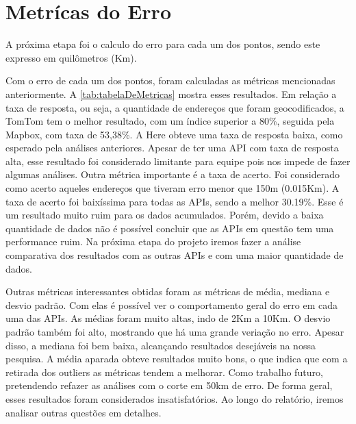 \section{Metrícas do Erro}
A próxima etapa foi o calculo do erro para cada um dos pontos, sendo este expresso em quilômetros (Km).

Com o erro de cada um dos pontos, foram calculadas as métricas mencionadas anteriormente. A \ref{tab:tabelaDeMetricas} mostra esses resultados. 
Em relação a taxa de resposta, ou seja, a quantidade de endereços que foram geocodificados, a TomTom tem o melhor resultado, com um índice superior a 80\%, seguida pela Mapbox, com taxa de 53,38\%. A Here obteve uma taxa de resposta baixa, como esperado pela análises anteriores. Apesar de ter uma API com taxa de resposta alta, esse resultado foi considerado limitante para equipe pois nos impede de fazer algumas análises.
Outra métrica importante é a taxa de acerto. Foi considerado como acerto aqueles endereços que tiveram erro menor que 150m (0.015Km). A taxa de acerto foi baixíssima para todas as APIs, sendo a melhor 30.19\%. Esse é um resultado muito ruim para os dados acumulados. Porém, devido a baixa quantidade de dados não é possível concluir que as APIs em questão tem uma performance ruim. Na próxima etapa do projeto iremos fazer a análise comparativa dos resultados com as outras APIs e com uma maior quantidade de dados. 

Outras métricas interessantes obtidas foram as métricas de média, mediana e desvio padrão. Com elas é possível ver o comportamento geral do erro em cada uma das APIs. As médias foram muito altas, indo de 2Km a 10Km. O desvio padrão também foi alto, mostrando que há uma grande veriação no erro. Apesar disso, a mediana foi bem baixa, alcançando resultados desejáveis na nossa pesquisa. A média aparada obteve resultados muito bons, o que indica que com a retirada dos outliers as métricas tendem a melhorar. Como trabalho futuro, pretendendo refazer as análises com o corte em 50km de erro. De forma geral, esses resultados foram considerados insatisfatórios. Ao longo do relatório, iremos analisar outras questões em detalhes.

